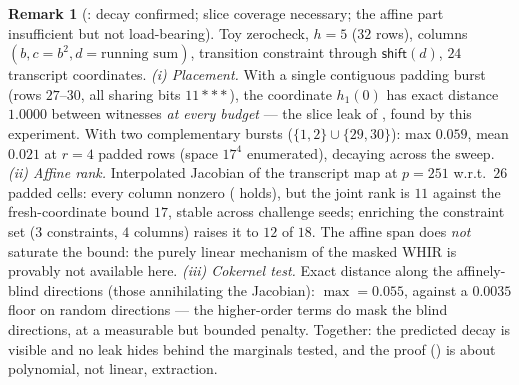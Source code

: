 \documentclass{article}
\theoremstyle{definition}
\newtheorem{remark}[theorem]{Remark}
\begin{document}
\begin{remark}[: decay confirmed; slice coverage necessary; the affine part insufficient but not load-bearing]\label{rem:numC}
Toy zerocheck, $h = 5$ ($32$ rows), columns $(b, c = b^2, d = \text{running sum})$, transition constraint through $\mathsf{shift}(d)$, $24$ transcript coordinates. \emph{(i) Placement.} With a single contiguous padding burst (rows $27$--$30$, all sharing bits $11{*}{*}{*}$), the coordinate $h_1(0)$ has exact distance $1.0000$ between witnesses \emph{at every budget} --- the slice leak of , found by this experiment. With two complementary bursts ($\{1, 2\} \cup \{29, 30\}$): max $0.059$, mean $0.021$ at $r = 4$ padded rows (space $17^4$ enumerated), decaying across the sweep. \emph{(ii) Affine rank.} Interpolated Jacobian of the transcript map at $p = 251$ w.r.t.\ $26$ padded cells: every column nonzero ( holds), but the joint rank is $11$ against the fresh-coordinate bound $17$, stable across challenge seeds; enriching the constraint set ($3$ constraints, $4$ columns) raises it to $12$ of $18$. The affine span does \emph{not} saturate the bound: the purely linear mechanism of the masked WHIR is provably not available here. \emph{(iii) Cokernel test.} Exact distance along the affinely-blind directions (those annihilating the Jacobian): $\max = 0.055$, against a $0.0035$ floor on random directions --- the higher-order terms do mask the blind directions, at a measurable but bounded penalty. Together: the predicted decay is visible and no leak hides behind the marginals tested, and the proof () is about polynomial, not linear, extraction.
\end{remark}
\end{document}
